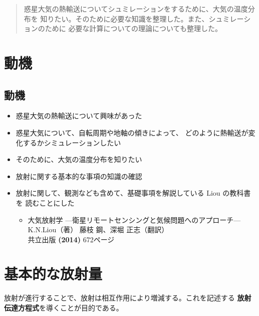 \documentclass[article]{dennou777}
\renewcommand{\maketitle}{\epmaketitle}
\begin{document}
\begin{titlepage}
	\maketitle
\end{titlepage}

\begin{abstract}
	惑星大気の熱輸送についてシュミレーションをするために、大気の温度分布を
	知りたい。そのために必要な知識を整理した。また、シュミレーションのために
	必要な計算についての理論についても整理した。
\end{abstract}

\tableofcontents
\pagebreak

\section{動機}

\subsection{動機}
\begin{itemize}
	\item 惑星大気の熱輸送について興味があった
	\item 惑星大気について、自転周期や地軸の傾きによって、
		どのように熱輸送が変化するかシミュレーションしたい
	\item そのために、大気の温度分布を知りたい
	\item 放射に関する基本的な事項の知識の確認
	\item 放射に関して、観測なども含めて、基礎事項を解説している Liou の教科書を
		読むことにした
		\begin{itemize}
			\item 大気放射学 {\scriptsize---衛星リモートセンシングと気候問題へのアプローチ---}\\
				K.N.Liou（著） 藤枝 鋼、深堀 正志（翻訳）\\
				共立出版 \textbf{(2014)} 672ページ
		\end{itemize}
\end{itemize}

\section{基本的な放射量}

放射が進行することで、放射は相互作用により増減する。これを記述する
\textbf{放射伝達方程式}を導くことが目的である。
\end{document}
